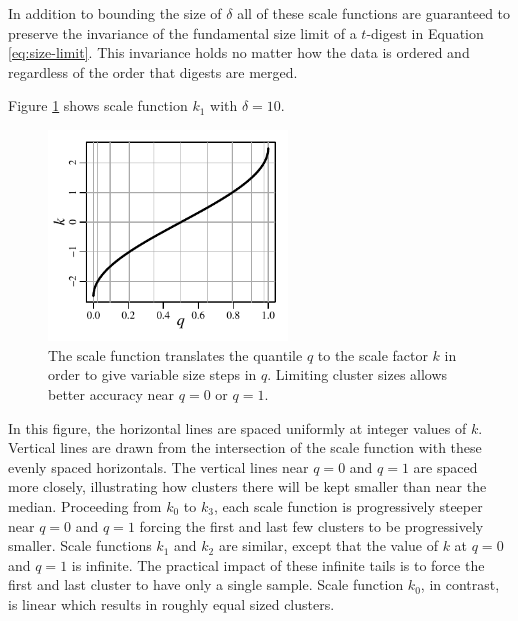 \documentclass{vldb}
\begin{document}
In addition to bounding the size of $\delta$ all of these scale functions are guaranteed to preserve the invariance of the fundamental size limit of a $t$-digest in Equation \ref{eq:size-limit}. This invariance holds no matter how the data is ordered and regardless of the order that digests are merged.

Figure \ref{fig:k-q-plot} shows scale function $k_1$ with $\delta=10$. 
\begin{figure}[htbp] %
   \centering
   \includegraphics[width=2.5in]{figures/k-q-plot.pdf} 
   \caption{The scale function translates the quantile $q$ to the scale factor $k$ in order to give variable size steps in $q$. Limiting cluster sizes allows better accuracy near $q=0$ or $q=1$. }
   \label{fig:k-q-plot}
\end{figure}
In this figure, the horizontal lines are spaced uniformly at integer values of $k$. Vertical lines are drawn from the intersection of the scale function with these evenly spaced horizontals. The  vertical lines near $q=0$ and $q=1$ are spaced more closely,  illustrating how clusters there will be kept smaller than near the median. Proceeding from $k_0$ to $k_3$, each scale function is progressively steeper near $q=0$ and $q=1$ forcing the first and last few clusters to be progressively smaller. Scale functions $k_1$ and $k_2$ are similar, except that the value of $k$ at $q=0$ and $q=1$ is infinite. The practical impact of these infinite tails is to force the first and last cluster to have only a single sample. 
Scale function $k_0$, in contrast, is linear which results in roughly equal sized clusters.
 
\end{document}
